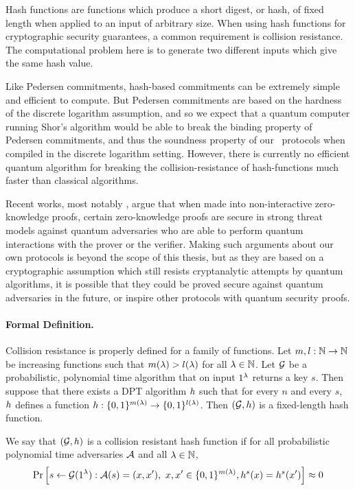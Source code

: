 Hash functions are functions which produce a short digest, or hash, of fixed length when applied to an input of arbitrary size. When using hash functions for cryptographic security guarantees, a common requirement is collision resistance. The computational problem here is to generate two different inputs which give the same hash value.

Like Pedersen commitments, hash-based commitments can be extremely simple and efficient to compute. But Pedersen commitments are based on the hardness of the discrete logarithm assumption, and so we expect that a quantum computer running Shor's algorithm would be able to break the binding property of Pedersen commitments, and thus the soundness property of our \ILC\ protocols when compiled in the discrete logarithm setting. However, there is currently no efficient quantum algorithm for breaking the collision-resistance of hash-functions much faster than classical algorithms.

Recent works, most notably \cite{Unruh17}, argue that when made into non-interactive zero-knowledge proofs, certain zero-knowledge proofs are secure in strong threat models against quantum adversaries who are able to perform quantum interactions with the prover or the verifier. Making such arguments about our own protocols is beyond the scope of this thesis, but as they are based on a cryptographic assumption which still resists cryptanalytic attempts by quantum algorithms, it is possible that they could be proved secure against quantum adversaries in the future, or inspire other protocols with quantum security proofs.

\paragraph{Formal Definition.} Collision resistance is properly defined for a family of functions. Let $m, l : \mathbb{N} \to \mathbb{N}$ be increasing functions such that $m (\lambda) > l(\lambda)$ for all $\lambda \in \mathbb{N}$. Let $\mathcal{G}$ be a probabilistic, polynomial time algorithm that on input $1^{\lambda}$ returns a key $s$. Then suppose that there exists a DPT algorithm $h$ such that for every $n$ and every $s$, $h$ defines a function $h : \{0,1\}^{m(\lambda)} \to \{0,1\}^{l(\lambda)}$. Then $(\mathcal{G},h)$ is a fixed-length hash function.

We say that $(\mathcal{G},h)$ is a collision resistant hash function if for all probabilistic polynomial time adversaries $\mathcal{A}$ and all $\lambda \in \mathbb{N}$,
$$ \Pr \left[ s \gets \mathcal{G}(1^{\lambda}) : \mathcal{A}(s) = (x,x'), \ x,x'\in \{0,1\}^{m(\lambda)}, h^s(x) = h^s(x') \right] \approx 0 $$

